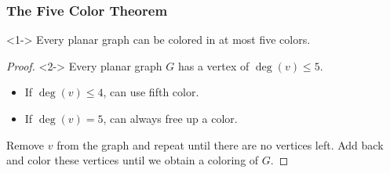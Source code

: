 \begin{frame}
    \frametitle{The Five Color Theorem}
    \begin{theorem}<1->
        Every planar graph can be colored in at most five colors.
    \end{theorem}
    \begin{proof}<2->
            Every planar graph $G$ has a vertex of $\deg(v)\leq 5$.
            \begin{itemize}
                \item If $\deg(v) \leq 4$, can use fifth color.
                \item If $\deg(v) = 5$, can always free up a color.
            \end{itemize}
            Remove $v$ from the graph and repeat until there are no vertices left. Add back and color these vertices until we obtain a coloring of $G$.
    \end{proof}
\end{frame}

